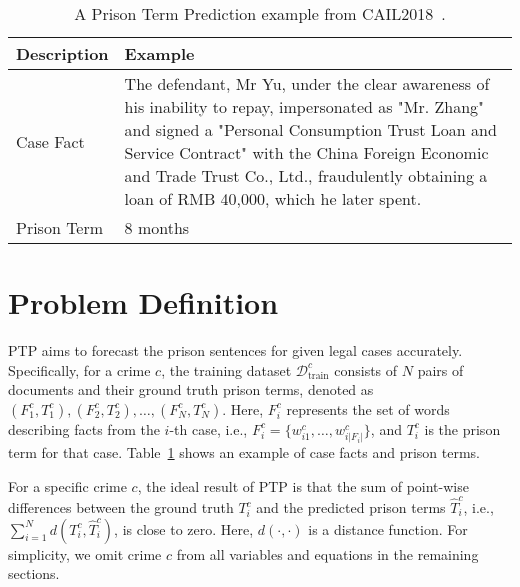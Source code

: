 \begin{table}[]
    \centering
    \scriptsize

    
    \caption{A Prison Term Prediction example from CAIL2018~\cite{DBLP:journals/corr/abs-1807-02478}.}
    \begin{tabular}{p{}p{}}
    \toprule
       Description  &  Example\\
       \hline
       Case Fact  &  The defendant, Mr Yu, under the clear awareness of his inability to repay, impersonated as "Mr. Zhang" and signed a "Personal Consumption Trust Loan and Service Contract" with the China Foreign Economic and Trade Trust Co., Ltd., fraudulently obtaining a loan of RMB 40,000, which he later spent.\\
       Prison Term & 8 months\\
       \bottomrule
    \end{tabular}
    \label{tab: case example}
    \vspace{-1em}
\end{table}

\section{Problem Definition}

PTP aims to forecast the prison sentences for given legal cases accurately. Specifically, for a crime $c$, the training dataset $\mathcal{D}_{\text{train}}^{c}$ consists of $N$ pairs of documents and their ground truth prison terms, denoted as ${(F_1^{c}, T_1^{c}),(F_2^{c}, T_2^{c}), \ldots, (F_N^{c}, T_N^{c})}$. Here, $F_i^{c}$ represents the set of words describing facts from the $i$-th case, i.e., $F_i^{c}=\{w_{i1}^{c},\ldots,w_{i|F_i|}^{c}\}$, and $T_i^{c}$ is the prison term for that case. Table~\ref{tab: case example} shows an example of case facts and prison terms.

For a specific crime $c$, the ideal result of PTP is that 
the sum of point-wise differences between the ground truth ${T}_i^{c}$ and the predicted prison terms $\hat{T}_i^{c}$, i.e., $\sum_{i=1}^N d({T}_i^{c}, \hat{T}_i^{c})$, is close to zero. Here, $d(\cdot,\cdot)$ is a distance function. For simplicity, we omit crime $c$ from all variables and equations in the remaining sections.

